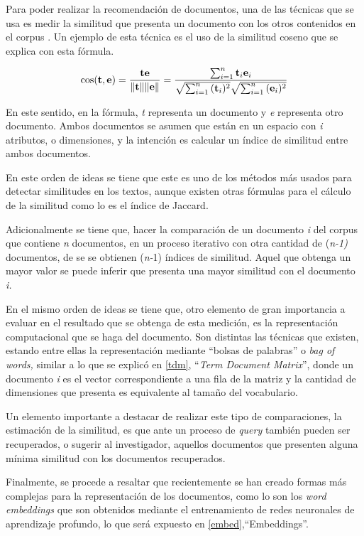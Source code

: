 \documentclass[
  12pt,
  openany]{book}
\begin{document}
Para poder realizar la recomendación de documentos, una de las técnicas que se usa es medir la similitud que presenta un documento con los otros contenidos en el corpus \citep{aggarwal2018a} . Un ejemplo de esta técnica es el uso de la similitud coseno que se explica con esta fórmula.

\begin{equation}
\cos ({\bf t},{\bf e})= {{\bf t} {\bf e} \over \|{\bf t}\| \|{\bf e}\|} = \frac{ \sum_{i=1}^{n}{{\bf t}_i{\bf e}_i} }{ \sqrt{\sum_{i=1}^{n}{({\bf t}_i)^2}} \sqrt{\sum_{i=1}^{n}{({\bf e}_i)^2}} }
\end{equation}

En este sentido, en la fórmula, \emph{t} representa un documento y \emph{e} representa otro documento. Ambos documentos se asumen que están en un espacio con \emph{i} atributos, o dimensiones, y la intención es calcular un índice de similitud entre ambos documentos.

En este orden de ideas se tiene que este es uno de los métodos más usados para detectar similitudes en los textos, aunque existen otras fórmulas para el cálculo de la similitud como lo es el índice de Jaccard.

Adicionalmente se tiene que, hacer la comparación de un documento \emph{i} del corpus que contiene \emph{n} documentos, en un proceso iterativo con otra cantidad de (\emph{n-1)} documentos, de se se obtienen (\emph{n-}1) índices de similitud. Aquel que obtenga un mayor valor se puede inferir que presenta una mayor similitud con el documento \emph{i.}

En el mismo orden de ideas se tiene que, otro elemento de gran importancia a evaluar en el resultado que se obtenga de esta medición, es la representación computacional que se haga del documento. Son distintas las técnicas que existen, estando entre ellas la representación mediante ``bolsas de palabras'' o \emph{bag of words,} similar a lo que se explicó en \ref{tdm}, ``\emph{Term Document Matrix}'', donde un documento \emph{i} es el vector correspondiente a una fila de la matriz y la cantidad de dimensiones que presenta es equivalente al tamaño del vocabulario.

Un elemento importante a destacar de realizar este tipo de comparaciones, la estimación de la similitud, es que ante un proceso de \emph{query} también pueden ser recuperados, o sugerir al investigador, aquellos documentos que presenten alguna mínima similitud con los documentos recuperados.

Finalmente, se procede a resaltar que recientemente se han creado formas más complejas para la representación de los documentos, como lo son los \emph{word embeddings} que son obtenidos mediante el entrenamiento de redes neuronales de aprendizaje profundo, lo que será expuesto en \ref{embed},``Embeddings''.
\end{document}
